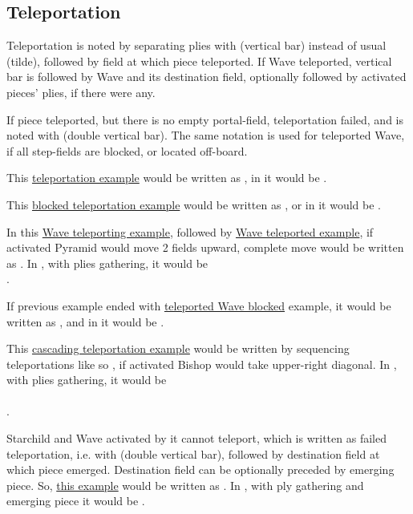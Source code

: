 \subsection*{Teleportation}
\label{sec:Appendix/Notation/Teleportation}

Teleportation is noted by separating plies with \alg{|} (vertical bar) instead of usual
\alg{\~{}} (tilde), followed by field at which piece teleported. If Wave teleported, vertical
bar is followed by Wave and its destination field, optionally followed by activated pieces'
plies, if there were any.

If piece teleported, but there is no empty portal-field, teleportation failed, and is noted
with \alg{||} (double vertical bar). The same notation is used for teleported Wave, if all
step-fields are blocked, or located off-board.

This \hyperref[fig:scn_n_02_teleport_init]{teleportation example} would be written as
, in  it would be .

This \hyperref[fig:scn_n_03_teleport_move_2]{blocked teleportation example} would be written
as , or in  it would be .

In this \hyperref[fig:scn_n_04_teleport_move_3]{Wave teleporting example}, followed by
\hyperref[fig:scn_n_05_teleport_end]{Wave teleported example}, if activated Pyramid would
move 2 fields upward, complete move would be written as .
In , with plies gathering, it would be \\
\alg{[Gi11-g15]\~{}[Wg15-a18]|[Wr1-l4]\~{}[Al4-l6]}.

If previous example ended with
\hyperref[fig:scn_n_06_teleport_wave_blocked]{teleported Wave blocked} example, it would be
written as , and in  it would be
\alg{[Gi11-g15]\~{}[Wg15-a18]||}.

This \hyperref[fig:scn_d_14_teleporting_wave_cascade]{cascading teleportation example} would
be written by sequencing teleportations like so , if activated
Bishop would take upper-right diagonal. In , with plies gathering, it would be \\
\alg{[Gj6-h2]\~{}[Wh2-b4]|[Wm18-a24]|[Wx1-r4]\~{}}\\
\alg{[Br4-t6]}.

Starchild and Wave activated by it cannot teleport, which is written as failed teleportation,
i.e. with \alg{||} (double vertical bar), followed by destination field at which piece emerged.
Destination field can be optionally preceded by emerging piece. So,
\hyperref[fig:scn_o_07_starchild_not_moving_monolith_init]{this example} would be written as
. In , with ply gathering and emerging piece it would be
.

